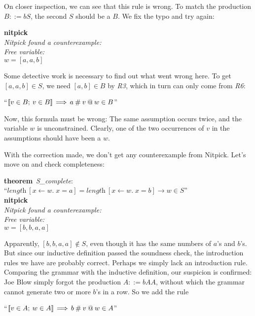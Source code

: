 \documentclass[a4paper,12pt]{article}
\begin{document}
On closer inspection, we can see that this rule is wrong. To match the
production $B ::= bS$, the second $S$ should be a $B$. We fix the typo and try
again:

\prew
\textbf{nitpick} \\[2\smallskipamount]
\slshape Nitpick found a counterexample: \\[2\smallskipamount]
\hbox{}\qquad Free variable: \nopagebreak \\
\hbox{}\qquad\qquad $w = [a, a, b]$
\postw

Some detective work is necessary to find out what went wrong here. To get $[a,
a, b] \in S$, we need $[a, b] \in B$ by \textit{R3}, which in turn can only come
from \textit{R6}:

\prew
``$\mathopen{[\![} v \in B;\> v \in B\mathclose{]\!]} \,\Longrightarrow\, a \mathbin{\#} v \mathbin{@} w \in B$''
\postw

Now, this formula must be wrong: The same assumption occurs twice, and the
variable $w$ is unconstrained. Clearly, one of the two occurrences of $v$ in
the assumptions should have been a $w$.

With the correction made, we don't get any counterexample from Nitpick. Let's
move on and check completeness:

\prew
\textbf{theorem}~\textit{S\_complete}: \\
``$\textit{length}~[x\mathbin{\leftarrow} w.\; x = a] =
   \textit{length}~[x\mathbin{\leftarrow} w.\; x = b]
  \longrightarrow w \in S$'' \\
\textbf{nitpick} \\[2\smallskipamount]
\slshape Nitpick found a counterexample: \\[2\smallskipamount]
\hbox{}\qquad Free variable: \nopagebreak \\
\hbox{}\qquad\qquad $w = [b, b, a, a]$
\postw

Apparently, $[b, b, a, a] \notin S$, even though it has the same numbers of
$a$'s and $b$'s. But since our inductive definition passed the soundness check,
the introduction rules we have are probably correct. Perhaps we simply lack an
introduction rule. Comparing the grammar with the inductive definition, our
suspicion is confirmed: Joe Blow simply forgot the production $A ::= bAA$,
without which the grammar cannot generate two or more $b$'s in a row. So we add
the rule

\prew
``$\mathopen{[\![} v \in A;\> w \in A\mathclose{]\!]} \,\Longrightarrow\, b \mathbin{\#} v \mathbin{@} w \in A$''
\postw
\end{document}
